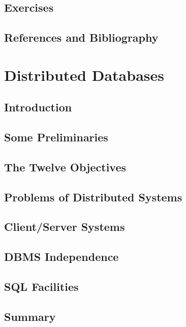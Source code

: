 \documentclass{book}
\begin{document}
\section{Exercises}

\section{References and Bibliography}












\chapter{Distributed Databases}

\section{Introduction}

\section{Some Preliminaries}

\section{The Twelve Objectives}

\section{Problems of Distributed Systems}

\section{Client/Server Systems}

\section{DBMS Independence}

\section{SQL Facilities}

\section{Summary}
\end{document}
